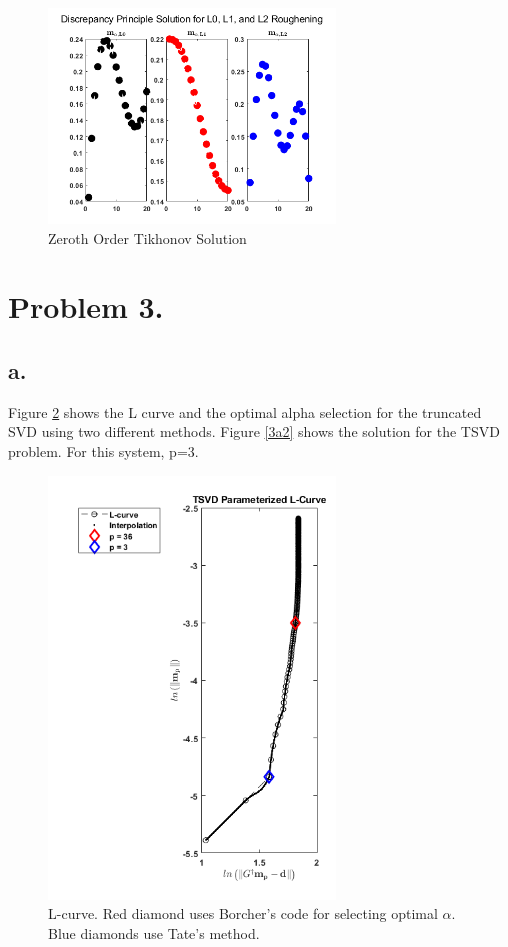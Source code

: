\documentclass{article}
\begin{document}
\begin{figure}[ht!]
    \centering
    \includegraphics[width=3in]{2f.png}
    \caption{Zeroth Order Tikhonov Solution}
    \label{2fsolutions}
\end{figure}


\section*{Problem 3.}
\subsection*{a.}
Figure \ref{3a1} shows the L curve and the optimal alpha selection for the truncated SVD using two different methods. Figure \ref{3a2} shows the solution for the TSVD problem. For this system, p=3. 

\begin{figure}[ht!]
    \centering
    \includegraphics[width=3in]{3a1.png}
    \caption{L-curve. Red diamond uses Borcher's code for selecting optimal $\alpha$. Blue diamonds use Tate's method.}
    \label{3a1}
\end{figure}
\end{document}
